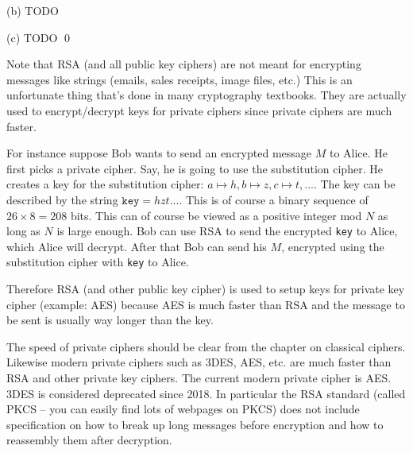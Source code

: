 (b)
TODO

(c)
TODO
\qed

Note that RSA (and all public key ciphers) are not
meant for encrypting messages like strings (emails, sales receipts,
image files, etc.)
This is an unfortunate thing that's done in many cryptography textbooks. 
They are actually used to encrypt/decrypt keys for private ciphers
since private ciphers are much faster.

For instance suppose Bob wants to send an encrypted message $M$ to Alice.
He first picks a private cipher.
Say, he is going to use the substitution cipher.
He creates a key for the substitution cipher:
$a \mapsto h, b \mapsto z, c \mapsto t, ...$.
The key can be  described by the string $\texttt{key} = hzt...$.
This is of course a binary sequence of $26 \times 8 = 208$ bits.
This can of course be viewed as a positive integer mod $N$ as long as
$N$ is large enough.
Bob can use RSA to send the encrypted \verb!key! to Alice,
which Alice will decrypt.
After that Bob can send his $M$, encrypted using the substitution cipher
with \verb!key! to Alice.

Therefore RSA (and other public key cipher) is used to
setup keys for private key cipher (example: AES) because
AES is much faster than RSA and the message to be sent is usually way
longer than the key.

The speed of private ciphers
should be clear from the chapter on classical ciphers.
Likewise modern private ciphers such as 3DES, AES, etc. are much faster
than RSA and other private key ciphers.
The current modern private cipher is AES.
3DES is considered deprecated since 2018.
In particular the RSA standard
(called PKCS -- you can easily find lots of webpages on PKCS)
does not include
specification on how to break up long messages before encryption and how to
reassembly them after decryption.

